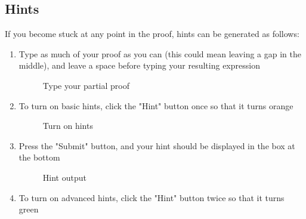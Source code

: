 \subsection{Hints}

If you become stuck at any point in the proof, hints can be generated as follows:

\begin{enumerate}
	\item Type as much of your proof as you can (this could mean leaving a gap in the middle), and leave a space before typing your resulting expression
	
	\begin{figure}[!ht]
		\centering
		\caption{Type your partial proof}
	\end{figure}
	
	\item To turn on basic hints, click the "Hint" button once so that it turns orange
	
	\begin{figure}[!ht]
		\centering
		\caption{Turn on hints}
	\end{figure}
	
	\item Press the "Submit" button, and your hint should be displayed in the box at the bottom
	
	\begin{figure}[!ht]
		\centering
		\caption{Hint output}
	\end{figure}
	\pagebreak
	\item To turn on advanced hints, click the "Hint" button twice so that it turns green
	

\end{enumerate}
